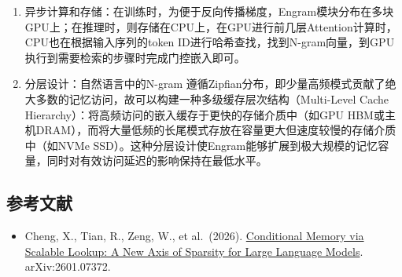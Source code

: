 \begin{enumerate}
\def\labelenumi{\arabic{enumi}.}
\item
  异步计算和存储：在训练时，为便于反向传播梯度，Engram模块分布在多块GPU上；在推理时，则存储在CPU上，在GPU进行前几层Attention计算时，CPU也在根据输入序列的token ID进行哈希查找，找到N-gram向量，到GPU执行到需要检索的步骤时完成门控嵌入即可。
\item
  分层设计：自然语言中的N-gram 遵循Zipfian分布，即少量高频模式贡献了绝大多数的记忆访问，故可以构建一种多级缓存层次结构（Multi-Level Cache Hierarchy）：将高频访问的嵌入缓存于更快的存储介质中（如GPU HBM或主机DRAM），而将大量低频的长尾模式存放在容量更大但速度较慢的存储介质中（如NVMe SSD）。这种分层设计使Engram能够扩展到极大规模的记忆容量，同时对有效访问延迟的影响保持在最低水平。
\end{enumerate}

\FloatBarrier
{}
\hypertarget{ux53c2ux8003ux6587ux732e-102}{%
\subsection{参考文献}\label{ux53c2ux8003ux6587ux732e-102}}

\vspace{0.25em}
\begin{itemize}
\tightlist
\item
  Cheng, X., Tian, R., Zeng, W., et al.~(2026). \href{https://arxiv.org/abs/2601.07372}{Conditional Memory via Scalable Lookup: A New Axis of Sparsity for Large Language Models}. arXiv:2601.07372.
\end{itemize}

\clearpage

